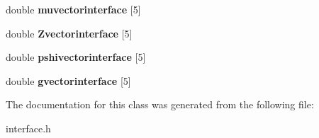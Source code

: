 \begin{DoxyCompactItemize}
\item 
double {\bfseries muvectorinterface} \mbox{[}5\mbox{]}\hypertarget{classinterface_a704c663452d5c33e640c245e2c012760}{}\label{classinterface_a704c663452d5c33e640c245e2c012760}

\item 
double {\bfseries Zvectorinterface} \mbox{[}5\mbox{]}\hypertarget{classinterface_a145c3591891dd8fc422952b3e244af89}{}\label{classinterface_a145c3591891dd8fc422952b3e244af89}

\item 
double {\bfseries pshivectorinterface} \mbox{[}5\mbox{]}\hypertarget{classinterface_ae1dfc4258075621f9080872760dc36b9}{}\label{classinterface_ae1dfc4258075621f9080872760dc36b9}

\item 
double {\bfseries gvectorinterface} \mbox{[}5\mbox{]}\hypertarget{classinterface_aedabb11c7b69c7f6d77c7c51fafbd54f}{}\label{classinterface_aedabb11c7b69c7f6d77c7c51fafbd54f}

\end{DoxyCompactItemize}


The documentation for this class was generated from the following file\+:\begin{DoxyCompactItemize}
\item 
interface.\+h\end{DoxyCompactItemize}
